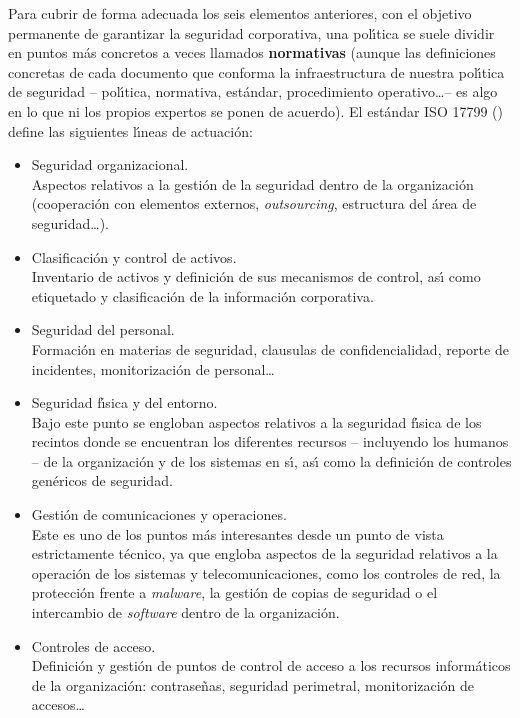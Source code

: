 Para cubrir de forma adecuada los seis elementos anteriores, con el objetivo 
permanente de
garantizar la seguridad corporativa, una pol\'{\i}tica se suele dividir en
puntos m\'as concretos a veces llamados {\bf normativas} (aunque las 
definiciones concretas de cada documento que conforma la infraestructura de
nuestra pol\'{\i}tica de seguridad -- pol\'{\i}tica, normativa, est\'andar,
procedimiento operativo\ldots -- es algo en lo que ni los propios expertos se
ponen de acuerdo). El est\'andar ISO 17799 (\cite{kn:iso}) define las siguientes
l\'{\i}neas de actuaci\'on:
\begin{itemize}
\item Seguridad organizacional.\\
Aspectos relativos a la gesti\'on de la seguridad dentro de la organizaci\'on
(cooperaci\'on con elementos externos, {\it outsourcing}, estructura del 
\'area de seguridad\ldots).
\item Clasificaci\'on y control de activos.\\
Inventario de activos y definici\'on de sus mecanismos de control, as\'{\i}
como etiquetado y clasificaci\'on de la informaci\'on corporativa.
\item Seguridad del personal.\\
Formaci\'on en materias de seguridad, clausulas de confidencialidad, reporte
de incidentes, monitorizaci\'on de personal\ldots
\item Seguridad f\'{\i}sica y del entorno.\\
Bajo este punto se engloban aspectos relativos a la seguridad f\'{\i}sica de los
recintos donde se encuentran los diferentes recursos -- incluyendo los humanos
-- de la organizaci\'on y de los sistemas en s\'{\i}, as\'{\i} como la
definici\'on de controles gen\'ericos de seguridad.
\item Gesti\'on de comunicaciones y operaciones.\\
Este es uno de los puntos m\'as interesantes desde un punto de vista 
estrictamente t\'ecnico, ya que engloba aspectos de la seguridad relativos a
la operaci\'on de los sistemas y telecomunicaciones, como los controles de
red, la protecci\'on frente a {\it malware}, la gesti\'on de copias de 
seguridad o el intercambio de {\it software} dentro de la organizaci\'on.
\item Controles de acceso.\\
Definici\'on y gesti\'on de puntos de control de acceso a los recursos 
inform\'aticos de la organizaci\'on: contrase\~nas, seguridad perimetral, 
monitorizaci\'on de accesos\ldots

\end{itemize}
